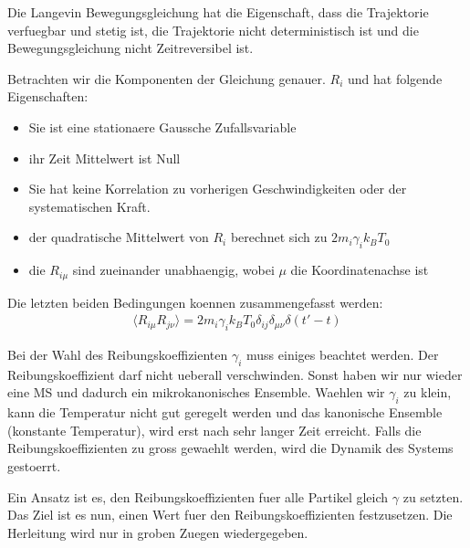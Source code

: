 \documentclass[]{article}
\begin{document}
Die Langevin Bewegungsgleichung hat  die Eigenschaft, dass die Trajektorie verfuegbar und stetig ist, die Trajektorie nicht deterministisch ist und die Bewegungsgleichung nicht Zeitreversibel ist. 


Betrachten wir die Komponenten der Gleichung genauer.
$R_i$ und hat folgende Eigenschaften: 
\begin{itemize}
	\item Sie ist eine stationaere Gaussche Zufallsvariable %
	\item ihr Zeit Mittelwert ist Null %
	\item Sie hat keine Korrelation zu vorherigen Geschwindigkeiten oder der systematischen Kraft. 
	\item der quadratische Mittelwert von $R_i$ berechnet sich zu $2 m_i \gamma_i k_B T_0$
	\item die $R_{i \mu}$ sind zueinander unabhaengig, wobei $\mu$ die Koordinatenachse ist %
\end{itemize}
Die letzten beiden Bedingungen koennen zusammengefasst werden: 
\begin{align*}
	\langle R_{i \mu} R_{j \nu } \rangle = 2 m_i \gamma_i k_B T_0 \delta_{ij} \delta_{\mu \nu} \delta(t' - t)
\end{align*}

Bei der Wahl des Reibungskoeffizienten $\gamma_i$ muss einiges beachtet werden. Der Reibungskoeffizient darf nicht ueberall verschwinden. Sonst haben wir nur wieder eine MS und dadurch ein mikrokanonisches Ensemble. Waehlen wir $\gamma_i$ zu klein, kann die Temperatur nicht gut geregelt werden und das kanonische Ensemble (konstante Temperatur), wird erst nach sehr langer Zeit erreicht. Falls die Reibungskoeffizienten zu gross gewaehlt werden, wird die Dynamik des Systems gestoerrt. 

Ein Ansatz ist es, den Reibungskoeffizienten fuer alle Partikel gleich $\gamma$ zu setzten. Das Ziel ist es nun, einen Wert fuer den Reibungskoeffizienten festzusetzen. Die Herleitung wird nur in groben Zuegen wiedergegeben. 
\end{document}
